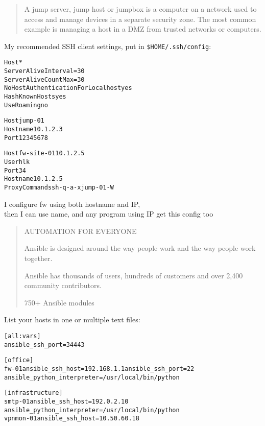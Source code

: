 \documentclass[Screen16to9,17pt]{foils}
\begin{document}

\begin{quote}
A jump server, jump host or jumpbox is a computer on a network used to access and manage devices in a separate security zone. The most common example is managing a host in a DMZ from trusted networks or computers.
\end{quote}




My recommended SSH client settings, put in \verb+$HOME/.ssh/config+:
\begin{alltt}\footnotesize
Host *
    ServerAliveInterval=30
    ServerAliveCountMax=30
    NoHostAuthenticationForLocalhost yes
    HashKnownHosts yes
    UseRoaming no

Host jump-01
  Hostname 10.1.2.3
  Port 12345678

Host fw-site-01 10.1.2.5
  User hlk
  Port 34
  Hostname 10.1.2.5
  ProxyCommand ssh -q -a -x jump-01 -W %h:%p
\end{alltt}

I configure fw using both hostname and IP,\\
then I can use name, and any program using IP get this config too




\begin{quote}\small
AUTOMATION FOR EVERYONE

Ansible is designed around the way people work and the way people work together.

Ansible has thousands of users, hundreds of customers and over 2,400 community contributors.

750+ Ansible modules
\end{quote}



List your hosts in one or multiple text files:
\begin{alltt}\footnotesize
[all:vars]
ansible_ssh_port=34443

[office]
fw-01 ansible_ssh_host=192.168.1.1 ansible_ssh_port=22
ansible_python_interpreter=/usr/local/bin/python

[infrastructure]
smtp-01     ansible_ssh_host=192.0.2.10
ansible_python_interpreter=/usr/local/bin/python
vpnmon-01   ansible_ssh_host=10.50.60.18

\end{alltt}
\end{document}
